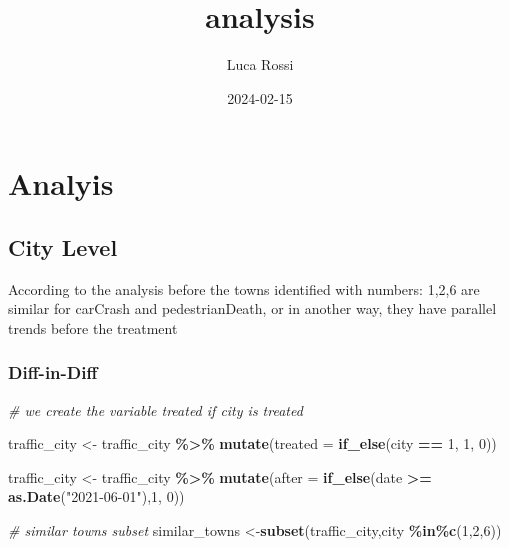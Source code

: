 \documentclass[
]{article}
\title{analysis}
\author{Luca Rossi}
\date{2024-02-15}
\newenvironment{Shaded}{\begin{snugshade}}{\end{snugshade}}
\newcommand{\AttributeTok}[1]{\textcolor[rgb]{0.13,0.29,0.53}{#1}}
\newcommand{\CommentTok}[1]{\textcolor[rgb]{0.56,0.35,0.01}{\textit{#1}}}
\newcommand{\DecValTok}[1]{\textcolor[rgb]{0.00,0.00,0.81}{#1}}
\newcommand{\FunctionTok}[1]{\textcolor[rgb]{0.13,0.29,0.53}{\textbf{#1}}}
\newcommand{\NormalTok}[1]{#1}
\newcommand{\OtherTok}[1]{\textcolor[rgb]{0.56,0.35,0.01}{#1}}
\newcommand{\SpecialCharTok}[1]{\textcolor[rgb]{0.81,0.36,0.00}{\textbf{#1}}}
\newcommand{\StringTok}[1]{\textcolor[rgb]{0.31,0.60,0.02}{#1}}
\begin{document}
\maketitle

\hypertarget{analyis}{%
\section{Analyis}\label{analyis}}

\hypertarget{city-level}{%
\subsection{City Level}\label{city-level}}

According to the analysis before the towns identified with numbers:
1,2,6 are similar for carCrash and pedestrianDeath, or in another way,
they have parallel trends before the treatment

\hypertarget{diff-in-diff}{%
\subsubsection{Diff-in-Diff}\label{diff-in-diff}}

\begin{Shaded}
\begin{Highlighting}[]
\CommentTok{\# we create the variable treated if city is treated}

\NormalTok{traffic\_city }\OtherTok{\textless{}{-}}\NormalTok{ traffic\_city }\SpecialCharTok{\%\textgreater{}\%}
  \FunctionTok{mutate}\NormalTok{(}\AttributeTok{treated =} \FunctionTok{if\_else}\NormalTok{(city }\SpecialCharTok{==} \DecValTok{1}\NormalTok{, }\DecValTok{1}\NormalTok{, }\DecValTok{0}\NormalTok{))}

\NormalTok{traffic\_city }\OtherTok{\textless{}{-}}\NormalTok{ traffic\_city }\SpecialCharTok{\%\textgreater{}\%}
  \FunctionTok{mutate}\NormalTok{(}\AttributeTok{after =} \FunctionTok{if\_else}\NormalTok{(date }\SpecialCharTok{\textgreater{}=} \FunctionTok{as.Date}\NormalTok{(}\StringTok{"2021{-}06{-}01"}\NormalTok{),}\DecValTok{1}\NormalTok{, }\DecValTok{0}\NormalTok{))}

\CommentTok{\# similar towns subset}
\NormalTok{similar\_towns }\OtherTok{\textless{}{-}}\FunctionTok{subset}\NormalTok{(traffic\_city,city }\SpecialCharTok{\%in\%}\FunctionTok{c}\NormalTok{(}\DecValTok{1}\NormalTok{,}\DecValTok{2}\NormalTok{,}\DecValTok{6}\NormalTok{))}
\end{Highlighting}
\end{Shaded}
\end{document}
